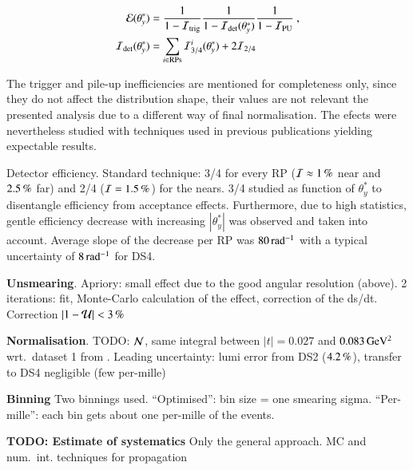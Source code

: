 \begin{equation}
\label{efficiency}
	\begin{aligned}
		{\cal E}(\theta_y^*) &= {1\over 1 - {\cal I}_{\rm trig}} {1\over 1 - {\cal I}_{\rm det}(\theta_y^*)} {1\over 1 - {\cal I}_{\rm PU}}\ ,\\
		{\cal I}_{\rm det}(\theta_y^*) &= \sum\limits_{i\in \rm RPs} {\cal I}^i_{3/4}(\theta_y^*) + 2 {\cal I}_{2/4}\\
	\end{aligned}
\end{equation}

The trigger and pile-up inefficiencies are mentioned for completeness only, since they do not affect the distribution shape, their values are not relevant the presented analysis due to a different way of final normalisation. The efects were nevertheless studied with techniques used in previous publications yielding expectable results.

Detector efficiency. Standard technique: 3/4 for every RP (${\cal I} \approx 1\,{\rm \%}$ near and $2.5\,{\rm \%}$ far) and 2/4 (${\cal I} = 1.5\,{\rm \%}$) for the nears. 3/4 studied as function of $\theta_y^*$ to disentangle efficiency from acceptance effects. Furthermore, due to high statistics, gentle efficiency decrease with increasing $|\theta_y^*|$ was observed and taken into account. Average slope of the decrease per RP was $80\,{\rm rad^{-1}}$ with a typical uncertainty of $8\,{\rm rad^{-1}}$ for DS4.


{\bf Unsmearing}. Apriory: small effect due to the good angular resolution (above). 2 iterations: fit, Monte-Carlo calculation of the effect, correction of the ds/dt. Correction $|1 - {\cal U}| < 3\,{\rm \%}$

{\bf Normalisation}. TODO: ${\cal N}$, same integral between $|t| = 0.027$ and $0.083\,{\rm GeV^2}$ wrt.~dataset 1 from \cite{prl111}. Leading uncertainty: lumi error from DS2 ($4.2\,{\rm \%}$), transfer to DS4 negligible (few per-mille)

{\bf Binning} Two binnings used. ``Optimised'': bin size = one smearing sigma. ``Per-mille'': each bin gets about one per-mille of the events.

{\bf TODO: Estimate of systematics} Only the general approach. MC and num.~int. techniques for propagation 

